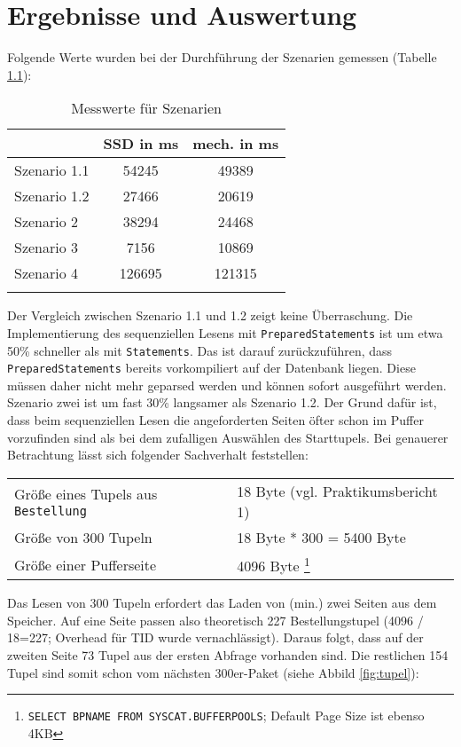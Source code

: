 \chapter{Ergebnisse und Auswertung}
Folgende Werte wurden bei der Durchführung der Szenarien gemessen (Tabelle \ref{tbl:measure}):

\begin{longtable}{|l|c|c|} \hline
& SSD in ms & mech. in ms \\ \hline
Szenario 1.1  & 54245 & 49389 \\ \hline
Szenario 1.2 & 27466 &  20619 \\ \hline
Szenario 2 & 38294 & 24468 \\ \hline
Szenario 3 & 7156 &  10869 \\ \hline
Szenario 4 & 126695 & 121315 \\ \hline
\caption{Messwerte für Szenarien}
\label{tbl:measure}
\end{longtable}

Der Vergleich zwischen Szenario 1.1 und 1.2 zeigt keine Überraschung. Die Implementierung des sequenziellen Lesens mit \texttt{PreparedStatements} ist um etwa 50\% schneller als mit \texttt{Statements}. Das ist darauf zurückzuführen, dass \texttt{PreparedStatements} bereits vorkompiliert auf der Datenbank liegen. Diese müssen daher nicht mehr geparsed werden und können sofort ausgeführt werden. \\
 
Szenario zwei ist um fast 30\% langsamer als Szenario 1.2. Der Grund dafür ist, dass beim sequenziellen Lesen die angeforderten Seiten öfter schon im Puffer vorzufinden sind als bei dem zufalligen Auswählen des Starttupels. Bei genauerer Betrachtung lässt sich folgender Sachverhalt feststellen:

\begin{longtable}{ll}
Größe eines Tupels aus \texttt{Bestellung} & 18 Byte (vgl. Praktikumsbericht 1) \\
Größe von 300 Tupeln & 18 Byte * 300 = 5400 Byte \\
Größe einer Pufferseite & 4096 Byte \footnote{\texttt{SELECT BPNAME FROM SYSCAT.BUFFERPOOLS}; Default Page Size ist ebenso 4KB}  \\
\end{longtable}

Das Lesen von 300 Tupeln erfordert das Laden von (min.) zwei Seiten aus dem Speicher. Auf eine Seite passen also theoretisch 227 Bestellungstupel (4096 / 18=227; Overhead für TID wurde vernachlässigt).
Daraus folgt, dass auf der zweiten Seite 73 Tupel aus der ersten Abfrage vorhanden sind. Die restlichen 154 Tupel sind somit schon vom nächsten 300er-Paket (siehe Abbild \ref{fig:tupel}):\\

